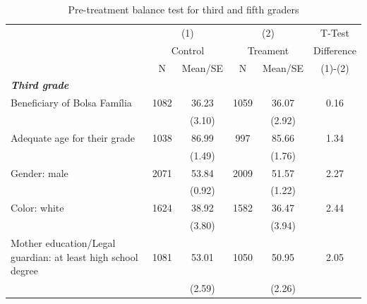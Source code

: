 \documentclass[
	article,			%
	12pt,				%
	oneside,			%
	a4paper,			%
	]{article}
\begin{document}
\begin{table}[h!]
  \centering
  \fontsize{8}{11}\selectfont
  \caption{Pre-treatment balance test for third and fifth graders}
\begin{tabular}{lccccc}
\hline
\hline
           & \multicolumn{ 2}{c}{(1)} & \multicolumn{ 2}{c}{(2)} &     T-Test \\

           & \multicolumn{ 2}{c}{Control} & \multicolumn{ 2}{c}{Treament} & Difference \\

           &          N &    Mean/SE &          N &    Mean/SE &    (1)-(2) \\
\hline
{\it {\bf Third grade}} &            &            &            &            &            \\

Beneficiary of Bolsa Família &       1082 &      36.23 &       1059 &      36.07 &       0.16 \\

           &            &     (3.10) &            &     (2.92) &            \\

Adequate age for their grade &       1038 &      86.99 &        997 &      85.66 &       1.34 \\

           &            &     (1.49) &            &     (1.76) &            \\

Gender: male &       2071 &      53.84 &       2009 &      51.57 &       2.27 \\

           &            &     (0.92) &            &     (1.22) &            \\

Color: white &       1624 &      38.92 &       1582 &      36.47 &       2.44 \\

           &            &     (3.80) &            &     (3.94) &            \\

Mother education/Legal guardian: at least high school degree &       1081 &      53.01 &       1050 &      50.95 &       2.05 \\

           &            &     (2.59) &            &     (2.26) &            \\


\end{tabular}
\end{table}
\end{document}
